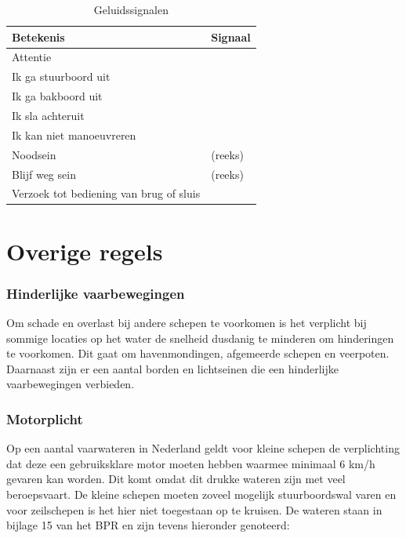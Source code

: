 \begin{table}[h]
	\centering
	\caption{Geluidssignalen}
	\label{tab:geluid}
	\begin{tabular}{l|l}
		\textbf{Betekenis} & \textbf{Signaal} \\ \hline
		Attentie & \slong  \\
		Ik ga stuurboord uit & \sshort \\
		Ik ga bakboord uit & \sshort \sspace \sshort \\
		Ik sla achteruit & \sshort \sspace \sshort \sspace \sshort \\
		Ik kan niet manoeuvreren & \sshort \sspace \sshort \sspace \sshort \sspace \sshort \\
		Noodsein & \slong \sspace  \slong \sspace  \slong \sspace (reeks)  \\
		Blijf weg sein\footnotemark & \sshort \sspace \slong \sspace \sshort \sspace \slong \sspace  \sshort \sspace \slong \sspace (reeks)  \\
		Verzoek tot bediening van brug of sluis & \slong \sspace  \sshort \sspace  \slong
	\end{tabular}
\end{table}


\section{Overige regels}
\subsubsection*{Hinderlijke vaarbewegingen}
Om schade en overlast bij andere schepen te voorkomen is het verplicht bij sommige locaties op het water de snelheid dusdanig te minderen om hinderingen te voorkomen. Dit gaat om havenmondingen, afgemeerde schepen en veerpoten. Daarnaast zijn er een aantal borden en lichtseinen die een hinderlijke vaarbewegingen verbieden.



\subsubsection*{Motorplicht}
Op een aantal vaarwateren in Nederland geldt voor kleine schepen de verplichting dat deze een gebruiksklare motor moeten hebben waarmee minimaal 6 km/h gevaren kan worden. Dit komt omdat dit drukke wateren zijn met veel beroepsvaart. De kleine schepen moeten zoveel mogelijk stuurboordswal varen en voor zeilschepen is het hier niet toegestaan op te kruisen. De wateren staan in bijlage 15 van het BPR en zijn tevens hieronder genoteerd:

